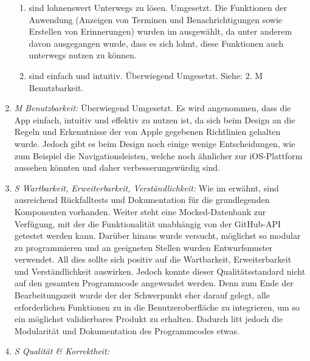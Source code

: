 \begin{enumerate}
\begin{enumerate}[label*={\arabic*}]
			\item sind lohnenswert Unterwegs zu lösen.\newline%
				Umgesetzt. Die Funktionen der Anwendung (Anzeigen von Terminen und Benachrichtigungen sowie Erstellen von Erinnerungen) wurden im  ausgewählt, da unter anderem davon ausgegangen wurde, dass es sich lohnt, diese Funktionen auch unterwegs nutzen zu können.
			\item sind einfach und intuitiv.\newline%
				Überwiegend Umgesetzt. Siehe: 2. M Benutzbarkeit. 
		\end{enumerate}
	
	\item \textit{M Benutzbarkeit:}\newline%
		Überwiegend Umgesetzt. Es wird angenommen, dass die App einfach, intuitiv und effektiv zu nutzen ist, da sich beim Design an die Regeln und Erkenntnisse der von Apple gegebenen Richtlinien gehalten wurde.%
		\newline%
		Jedoch gibt es beim Design noch einige wenige Entscheidungen, wie zum Beispiel die Navigationsleisten, welche noch ähnlicher zur iOS-Plattform aussehen könnten und daher verbesserungswürdig sind.%
	\item \textit{S Wartbarkeit, Erweiterbarkeit, Verständlichkeit:}\newline%
		Wie im  erwähnt, sind ausreichend Rückfalltests und Dokumentation für die grundlegenden Komponenten vorhanden. Weiter steht eine Mocked-Datenbank zur Verfügung, mit der die Funktionalität unabhängig von der GitHub-API getestet werden kann. Darüber hinaus wurde versucht, möglichst so modular zu programmieren und an geeigneten Stellen wurden Entwurfsmuster verwendet. All dies sollte sich positiv auf die Wartbarkeit, Erweiterbarkeit und Verständlichkeit auswirken.%
		Jedoch konnte dieser Qualitätsstandard nicht auf den gesamten Programmcode angewendet werden. Denn zum Ende der Bearbeitungszeit wurde der der Schwerpunkt eher darauf gelegt, alle erforderlichen Funktionen zu in die Benutzeroberfläche zu integrieren, um so ein möglichst validierbares Produkt zu erhalten. Dadurch litt jedoch die Modularität und Dokumentation des Programmcodes etwas.%
	\item \textit{S Qualität \& Korrektheit:}\newline%

\end{enumerate}
